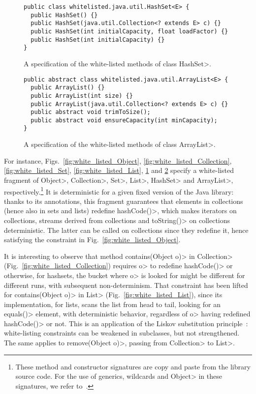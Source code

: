 \begin{figure}
\begin{verbatim}
public class whitelisted.java.util.HashSet<E> {
  public HashSet() {}
  public HashSet(java.util.Collection<? extends E> c) {}
  public HashSet(int initialCapacity, float loadFactor) {}
  public HashSet(int initialCapacity) {}
}
\end{verbatim}
\caption{A specification of the white-listed methods of class \<HashSet>.}
\label{fig:white_listed_HashSet}
\end{figure}

\begin{figure}
\begin{verbatim}
public abstract class whitelisted.java.util.ArrayList<E> {
  public ArrayList() {}
  public ArrayList(int size) {}
  public ArrayList(java.util.Collection<? extends E> c) {}
  public abstract void trimToSize();
  public abstract void ensureCapacity(int minCapacity);
}
\end{verbatim}
\caption{A specification of the white-listed methods of class \<ArrayList>.}
\label{fig:white_listed_ArrayList}
\end{figure}

For instance, Figs.~\ref{fig:white_listed_Object}, \ref{fig:white_listed_Collection},
\ref{fig:white_listed_Set}, \ref{fig:white_listed_List},
\ref{fig:white_listed_HashSet} and \ref{fig:white_listed_ArrayList}
specify a white-listed fragment of \<Object>,
\<Collection>, \<Set>, \<List>, \<HashSet> and \<ArrayList>,
respectively.\footnote{These method and constructor signatures are copy and paste from the
library source code. For the use of generics, wildcards and
\<Object> in these signatures, we refer to~\cite{NaftalinW06}.}
It is deterministic for a given fixed version of the Java library:
thanks to its annotations, this fragment guarantees that elements in collections
(hence also in sets and lists) redefine \<hashCode()>, which makes iterators
on collections, streams derived from collections and \<toString()> on collections
deterministic. The latter can be called on collections since they redefine it,
hence satisfying the constraint in Fig.~\ref{fig:white_listed_Object}.

It is interesting to observe that method
\<contains(Object o)> in \<Collection> (Fig.~\ref{fig:white_listed_Collection})
requires \<o> to redefine \<hashCode()>
or otherwise, for hashsets, the bucket where \<o> is looked for might be different
for different runs, with subsequent non-determinism.
That constraint has been lifted for \<contains(Object o)> in \<List>
(Fig.~\ref{fig:white_listed_List}), since its implementation, for lists,
scans the list from head to tail,
looking for an \<equals()> element, with deterministic behavior,
regardless of \<o> having redefined \<hashCode()> or not. This is an application
of the Liskov substitution principle~\cite{LiskovW94}:
white-listing constraints can be weakened in subclasses,
but not strengthened. The same applies to \<remove(Object o)>, passing from
\<Collection> to \<List>.

